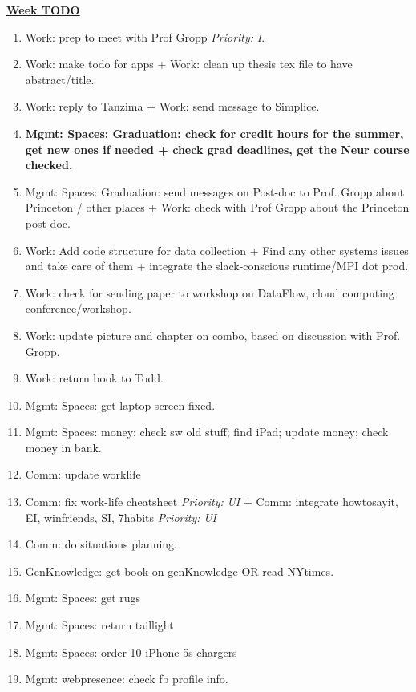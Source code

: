 \documentclass[serif,mathserif,final]{beamer}
\newcommand{\priority}[1]{\textit{Priority:} \textit{#1}}
\begin{document}
\begin{frame}{}
\begin{columns}[t]
\begin{column}{0.33\linewidth}{\textbf{\underline{Week TODO}}}
\begin{block}

\begin{enumerate} 
\item \tiny Work: prep to meet with Prof Gropp  \priority{I}. 
\item \tiny Work: make todo for apps + Work: clean up thesis tex file to have abstract/title. 

\item \tiny Work: reply to Tanzima + Work: send message to Simplice. 

\item \tiny \textbf{Mgmt: Spaces: Graduation: check for credit hours for the summer, get new ones if needed + check grad deadlines, get the Neur course checked}. 
\item \tiny Mgmt: Spaces: Graduation: send messages on Post-doc to Prof. Gropp about Princeton / other places + Work: check with Prof Gropp about the Princeton post-doc. 

\item \tiny Work: Add code structure for data collection + Find any other systems issues and take care of them + integrate the slack-conscious runtime/MPI dot prod. 
\item \tiny Work: check for sending paper to workshop on DataFlow, cloud computing conference/workshop. 
\item \tiny Work: update picture and chapter on combo, based on discussion with Prof. Gropp. 

\item \tiny Work: return book to Todd. 
\item \tiny Mgmt: Spaces: get laptop screen fixed. 

\item \tiny Mgmt: Spaces: money: check sw old stuff; find iPad; update money; check money in bank. 

\item \tiny Comm: update worklife 

\item \tiny Comm: fix work-life cheatsheet \priority{UI} +  Comm:
  integrate howtosayit, EI, winfriends, SI, 7habits \priority{UI} 

\item \tiny Comm: do situations planning. 

\item \tiny GenKnowledge: get book on genKnowledge OR read NYtimes. 
\item \tiny Mgmt: Spaces: get rugs 
\item \tiny Mgmt: Spaces: return taillight
\item \tiny Mgmt: Spaces: order 10 iPhone 5s chargers 
\item \tiny  Mgmt: webpresence: check fb profile info.
 

\end{enumerate}
\end{block}
\end{column}
\end{columns}
\end{frame}
\end{document}
